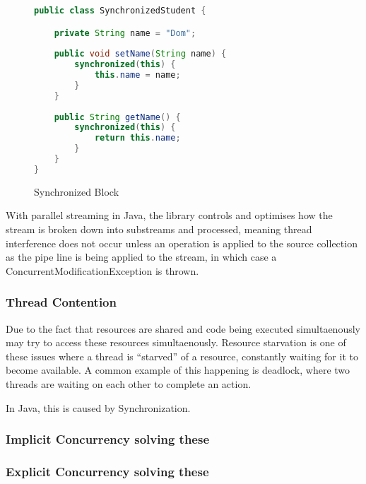 \documentclass[]{report}
\begin{document}
\begin{figure}
\caption{Synchronized Block}
\begin{lstlisting}[language=Java,frame=single]
public class SynchronizedStudent {

	private String name = "Dom";
	
	public void setName(String name) {
		synchronized(this) {
			this.name = name;
		}
	}
	
	public String getName() {
		synchronized(this) {
			return this.name;
		}
	}
}
\end{lstlisting}
\end{figure}
 
With parallel streaming in Java, the library controls and optimises how the stream is broken down into substreams and processed, meaning thread interference does not occur unless an operation is applied to the source collection as the pipe line is being applied to the stream, in which case a ConcurrentModificationException is thrown.

\subsubsection{Thread Contention} 
Due to the fact that resources are shared and code being executed simultaenously may try to access these resources simultaenously. Resource starvation is one of these issues where a thread is “starved” of a resource, constantly waiting for it to become available. A common example of this happening is deadlock, where two threads are waiting on each other to complete an action.

In Java, this is caused by Synchronization.
\subsubsection{Implicit Concurrency solving these}
\subsubsection{Explicit Concurrency solving these}
\end{document}
